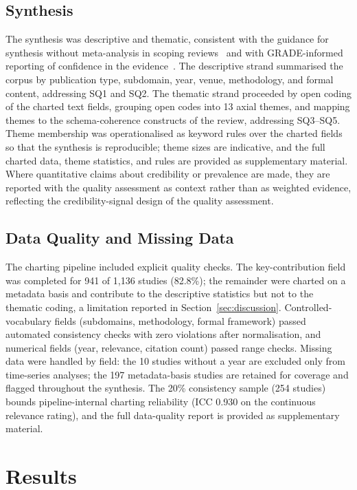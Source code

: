 \subsection{Synthesis}
The synthesis was descriptive and thematic, consistent with the guidance for synthesis without meta-analysis in scoping reviews~\cite{campbell2020swim,harrison2017albatross} and with GRADE-informed reporting of confidence in the evidence~\cite{guyatt2008grade}. The descriptive strand summarised the corpus by publication type, subdomain, year, venue, methodology, and formal content, addressing SQ1 and SQ2. The thematic strand proceeded by open coding of the charted text fields, grouping open codes into 13 axial themes, and mapping themes to the schema-coherence constructs of the review, addressing SQ3--SQ5. Theme membership was operationalised as keyword rules over the charted fields so that the synthesis is reproducible; theme sizes are indicative, and the full charted data, theme statistics, and rules are provided as supplementary material. Where quantitative claims about credibility or prevalence are made, they are reported with the quality assessment as context rather than as weighted evidence, reflecting the credibility-signal design of the quality assessment.

\subsection{Data Quality and Missing Data}
The charting pipeline included explicit quality checks. The key-contribution field was completed for 941 of 1,136 studies (82.8\%); the remainder were charted on a metadata basis and contribute to the descriptive statistics but not to the thematic coding, a limitation reported in Section~\ref{sec:discussion}. Controlled-vocabulary fields (subdomains, methodology, formal framework) passed automated consistency checks with zero violations after normalisation, and numerical fields (year, relevance, citation count) passed range checks. Missing data were handled by field: the 10 studies without a year are excluded only from time-series analyses; the 197 metadata-basis studies are retained for coverage and flagged throughout the synthesis. The 20\% consistency sample (254 studies) bounds pipeline-internal charting reliability (ICC 0.930 on the continuous relevance rating), and the full data-quality report is provided as supplementary material.

\section{Results}\label{sec:results}

